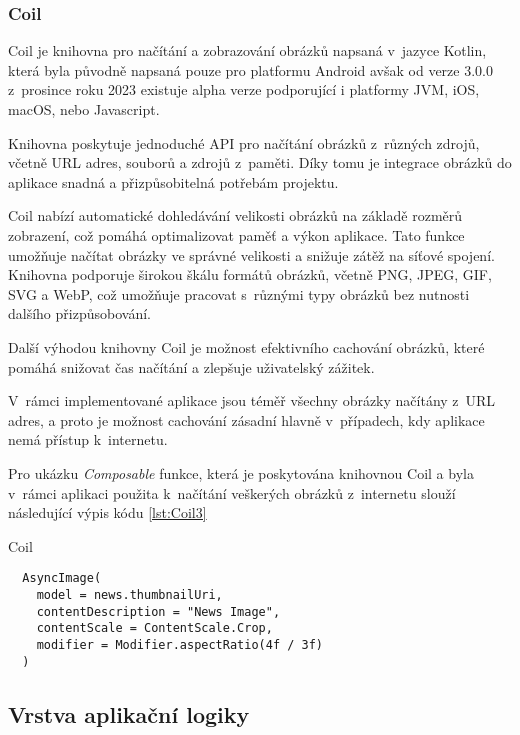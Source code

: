 \subsubsection*{Coil}
Coil je knihovna pro načítání a zobrazování obrázků napsaná v~jazyce Kotlin, která byla původně napsaná pouze pro platformu Android avšak
od verze 3.0.0 z~prosince roku 2023 existuje alpha verze podporující i platformy JVM, iOS, macOS, nebo Javascript.  

Knihovna poskytuje jednoduché API pro načítání obrázků
z~různých zdrojů, včetně URL adres, souborů a zdrojů z~paměti. Díky tomu je integrace obrázků do aplikace snadná a přizpůsobitelná potřebám projektu.

Coil nabízí automatické dohledávání velikosti obrázků na základě rozměrů zobrazení, což pomáhá optimalizovat paměť a výkon aplikace. Tato funkce 
umožňuje načítat obrázky ve správné velikosti a snižuje zátěž na síťové spojení. Knihovna podporuje širokou škálu formátů obrázků, včetně PNG, 
JPEG, GIF, SVG a WebP, což umožňuje pracovat s~různými typy obrázků bez nutnosti dalšího přizpůsobování.

Další výhodou knihovny Coil je možnost efektivního cachování obrázků, které pomáhá snižovat čas načítání a zlepšuje uživatelský zážitek.

V~rámci implementované aplikace jsou téměř všechny obrázky načítány z~URL adres, a proto je možnost cachování zásadní hlavně v~případech, 
kdy aplikace nemá přístup k~internetu.

Pro ukázku \textit{Composable} funkce, která je poskytována knihovnou Coil a byla v~rámci
aplikaci použita k~načítání veškerých obrázků z~internetu slouží následující výpis kódu \ref{lst:Coil3}

\begin{listing}[H]
\caption{Coil}\label{lst:Coil3}
\begin{verbatim}
  AsyncImage(
    model = news.thumbnailUri,
    contentDescription = "News Image",
    contentScale = ContentScale.Crop,
    modifier = Modifier.aspectRatio(4f / 3f)
  )
\end{verbatim}
\end{listing}

\subsection{Vrstva aplikační logiky}


